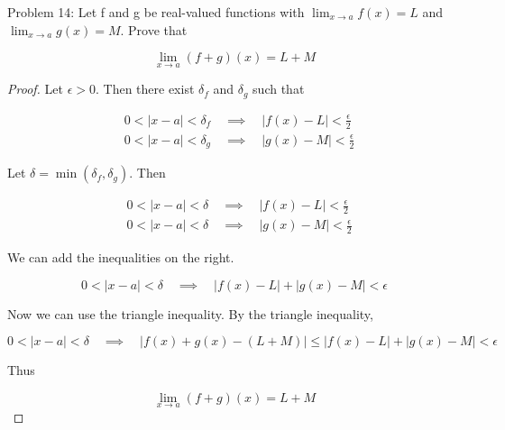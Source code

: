 \usepackage{amsthm}

Problem 14: Let f and g be real-valued functions with $\lim_{x \rightarrow a} f(x) = L$ and $\lim_{x \rightarrow a} g(x) = M$. Prove that

$$ \lim_{x \rightarrow a} (f + g)(x) = L + M $$

\begin{proof}
Let $\epsilon > 0$. Then there exist $\delta_f$ and $\delta_g$ such that

\begin{align}
& 0 < |x - a| < \delta_f \quad \implies \quad |f(x) - L| < \frac{\epsilon}{2} \\ 
& 0 < |x - a| < \delta_g \quad \implies \quad |g(x) - M| < \frac{\epsilon}{2}
\end{align}

Let $\delta = \min(\delta_f, \delta_g)$. Then

\begin{align}
& 0 < |x - a| < \delta \quad \implies \quad |f(x) - L| < \frac{\epsilon}{2} \\ 
& 0 < |x - a| < \delta \quad \implies \quad |g(x) - M| < \frac{\epsilon}{2}
\end{align}

We can add the inequalities on the right.

$$ 0 < |x - a| < \delta \quad \implies \quad |f(x) - L| + |g(x) - M| < \epsilon $$

Now we can use the triangle inequality. By the triangle inequality,

$$ 0 < |x - a| < \delta \quad \implies \quad |f(x) + g(x) - (L + M)| \leq |f(x) - L| + |g(x) - M| < \epsilon $$

Thus

$$ \lim_{x \rightarrow a} (f + g)(x) = L + M $$
\end{proof}
